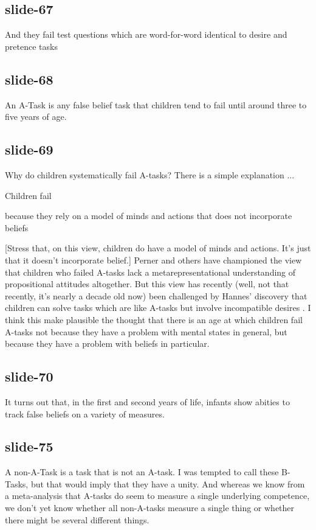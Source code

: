 \documentclass[12pt,\papersize]{extarticle}
\begin{document}
\subsection{slide-67}
And they fail test questions which are word-for-word identical to desire and pretence tasks

\subsection{slide-68}
An A-Task is any false belief task that children tend to fail until around
three to five years of age.

\subsection{slide-69}
Why do children systematically fail A-tasks? There is a simple explanation ...

Children fail



because they rely on a model of minds and actions that does not incorporate beliefs


[Stress that, on this view, children do have a model of minds and actions.
It’s just that it doesn’t incorporate belief.]
Perner and others have championed the view that children who failed A-tasks
lack a metarepresentational understanding of propositional attitudes
altogether.  But this view has recently (well, not that recently, it’s nearly
a decade old now) been challenged by Hannes’ discovery
that children can solve tasks which are like A-tasks but involve incompatible
desires \citep{rakoczy:2007_desire}.  I think this make plausible the thought
that there is an age at which
children fail A-tasks not because they have a problem with mental states
in general, but because they have a problem with beliefs in particular.

\subsection{slide-70}
It turns out that, in the first and second years of life, infants show abities
to track false beliefs on a variety of measures.

\subsection{slide-75}
A non-A-Task is a task that is not an A-task.  I was tempted to call these
B-Tasks, but that would imply that they have a unity.  And whereas we know
from a meta-analysis that A-tasks do seem to measure a single underlying
competence, we don’t yet know whether all non-A-tasks measure a single thing
or whether there might be several different things.
\end{document}
